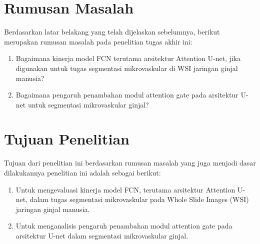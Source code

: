 \section{Rumusan Masalah}
\noindent Berdasarkan latar belakang yang telah dijelaskan sebelumnya, berikut merupakan rumusan masalah pada penelitian tugas akhir ini:
\begin{enumerate}
    \item Bagaimana kinerja model FCN terutama arsitektur Attention U-net, jika digunakan untuk tugas segmentasi mikrovaskular di WSI jaringan ginjal manusia?
    \item Bagaimana pengaruh penambahan modul attention gate pada arsitektur U-net untuk segmentasi mikrovaskular ginjal?
\end{enumerate}

\section{Tujuan Penelitian}

\noindent Tujuan dari penelitian ini berdasarkan rumusan masalah yang juga menjadi dasar dilakukannya penelitian ini adalah sebagai berikut:
\begin{enumerate}
    \item Untuk mengevaluasi kinerja model FCN, terutama arsitektur Attention U-net, dalam tugas segmentasi mikrovaskular pada Whole Slide Images (WSI) jaringan ginjal manusia.
    \item Untuk menganalisis pengaruh penambahan modul attention gate pada arsitektur U-net dalam segmentasi mikrovaskular ginjal.
\end{enumerate}

